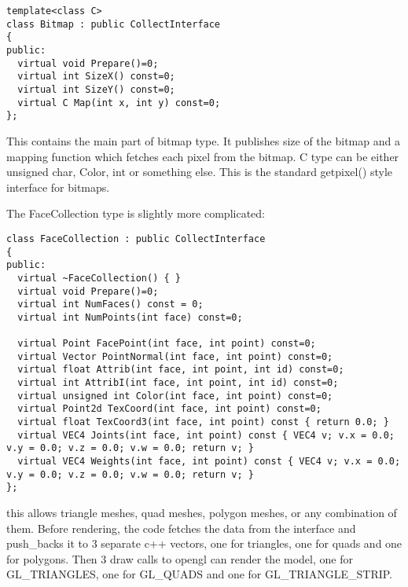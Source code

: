 \documentclass[11pt,twoside,a4paper]{article}
\begin{document}
\begin{verbatim}
template<class C>
class Bitmap : public CollectInterface
{
public:
  virtual void Prepare()=0;
  virtual int SizeX() const=0;
  virtual int SizeY() const=0;
  virtual C Map(int x, int y) const=0;
};
\end{verbatim}

This contains the main part of bitmap type. It publishes size of the bitmap and a mapping function which fetches each pixel from the bitmap. C type can be either unsigned char, Color, int or something else. This is the standard getpixel() style interface for bitmaps.

The FaceCollection type is slightly more complicated:

\begin{verbatim}
class FaceCollection : public CollectInterface
{
public:
  virtual ~FaceCollection() { }
  virtual void Prepare()=0;
  virtual int NumFaces() const = 0;
  virtual int NumPoints(int face) const=0;
  
  virtual Point FacePoint(int face, int point) const=0;
  virtual Vector PointNormal(int face, int point) const=0;
  virtual float Attrib(int face, int point, int id) const=0;
  virtual int AttribI(int face, int point, int id) const=0;
  virtual unsigned int Color(int face, int point) const=0;
  virtual Point2d TexCoord(int face, int point) const=0;
  virtual float TexCoord3(int face, int point) const { return 0.0; }
  virtual VEC4 Joints(int face, int point) const { VEC4 v; v.x = 0.0; v.y = 0.0; v.z = 0.0; v.w = 0.0; return v; }
  virtual VEC4 Weights(int face, int point) const { VEC4 v; v.x = 0.0; v.y = 0.0; v.z = 0.0; v.w = 0.0; return v; }
};
\end{verbatim}

this allows triangle meshes, quad meshes, polygon meshes, or any
combination of them. Before rendering, the code fetches the data from
the interface and push\_backs it to 3 separate c++ vectors, one for triangles, one for quads and one for polygons. Then 3 draw calls to opengl can render the model, one for GL\_TRIANGLES, one for GL\_QUADS and one for GL\_TRIANGLE\_STRIP.
\end{document}
